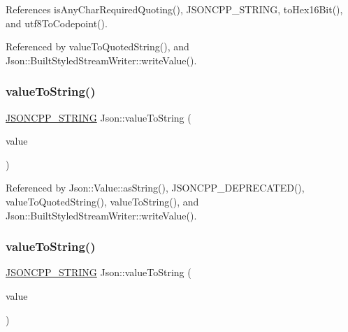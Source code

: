 References is\+Any\+Char\+Required\+Quoting(), J\+S\+O\+N\+C\+P\+P\+\_\+\+S\+T\+R\+I\+NG, to\+Hex16\+Bit(), and utf8\+To\+Codepoint().



Referenced by value\+To\+Quoted\+String(), and Json\+::\+Built\+Styled\+Stream\+Writer\+::write\+Value().

\mbox{\label{namespaceJson_a498503e8f49d6a3811e3c9f6757da60d_a498503e8f49d6a3811e3c9f6757da60d}} 
\subsubsection{\texorpdfstring{value\+To\+String()}{valueToString()}\hspace{0.1cm}{\footnotesize\ttfamily [1/6]}}
{\footnotesize\ttfamily \hyperlink{json_8h_a1e723f95759de062585bc4a8fd3fa4be_a1e723f95759de062585bc4a8fd3fa4be}{J\+S\+O\+N\+C\+P\+P\+\_\+\+S\+T\+R\+I\+NG} Json\+::value\+To\+String (\begin{DoxyParamCaption}\item[{\hyperlink{namespaceJson_a08122e8005b706d982e48cca1e2119c7_a08122e8005b706d982e48cca1e2119c7}{Int}}]{value }\end{DoxyParamCaption})}



Referenced by Json\+::\+Value\+::as\+String(), J\+S\+O\+N\+C\+P\+P\+\_\+\+D\+E\+P\+R\+E\+C\+A\+T\+E\+D(), value\+To\+Quoted\+String(), value\+To\+String(), and Json\+::\+Built\+Styled\+Stream\+Writer\+::write\+Value().

\mbox{\label{namespaceJson_ab2cb54f173193c8d27c3eb7f10b6e79a_ab2cb54f173193c8d27c3eb7f10b6e79a}} 
\subsubsection{\texorpdfstring{value\+To\+String()}{valueToString()}\hspace{0.1cm}{\footnotesize\ttfamily [2/6]}}
{\footnotesize\ttfamily \hyperlink{json_8h_a1e723f95759de062585bc4a8fd3fa4be_a1e723f95759de062585bc4a8fd3fa4be}{J\+S\+O\+N\+C\+P\+P\+\_\+\+S\+T\+R\+I\+NG} Json\+::value\+To\+String (\begin{DoxyParamCaption}\item[{\hyperlink{namespaceJson_a800fb90eb6ee8d5d62b600c06f87f7d4_a800fb90eb6ee8d5d62b600c06f87f7d4}{U\+Int}}]{value }\end{DoxyParamCaption})}



